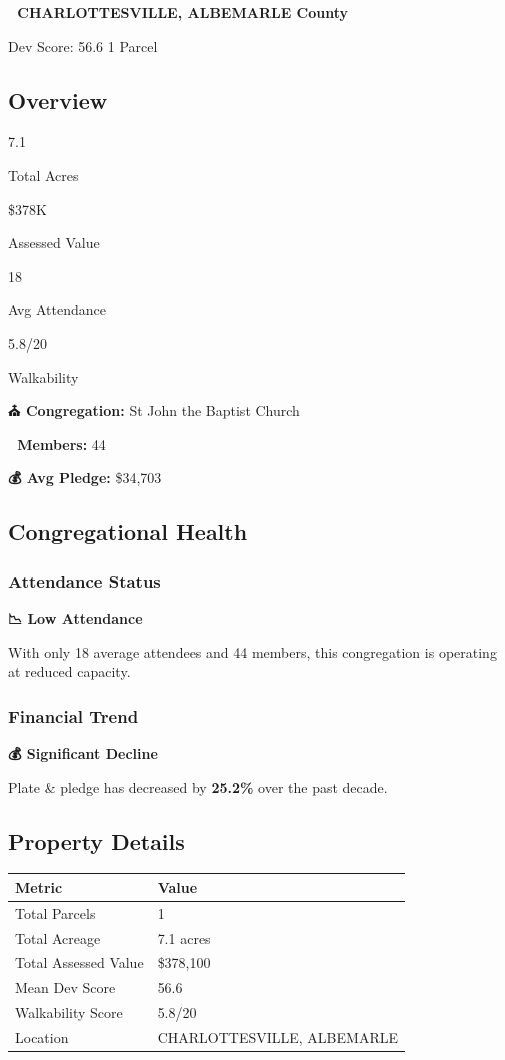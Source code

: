 \documentclass[
  letterpaper,
  DIV=11,
  numbers=noendperiod,
  oneside]{scrreprt}
\begin{document}

\textbf{📍 CHARLOTTESVILLE, ALBEMARLE County}

{Dev Score: 56.6} {1 Parcel}

\subsection{Overview}

{7.1}

{Total Acres}

{\$378K}

{Assessed Value}

{18}

{Avg Attendance}

{5.8/20}

{Walkability}

\textbf{⛪ Congregation:} St John the Baptist Church

\textbf{👥 Members:} 44

\textbf{💰 Avg Pledge:} \$34,703

\subsection{Congregational Health}

\subsubsection{Attendance Status}\label{attendance-status-6}

\textbf{📉 Low Attendance}

With only 18 average attendees and 44 members, this congregation is
operating at reduced capacity.

\subsubsection{Financial Trend}\label{financial-trend-6}

\textbf{💰 Significant Decline}

Plate \& pledge has decreased by \textbf{25.2\%} over the past decade.

\subsection{Property Details}

\begin{longtable}[]{@{}ll@{}}
\toprule\noalign{}
Metric & Value \\
\midrule\noalign{}
\endhead
\bottomrule\noalign{}
\endlastfoot
Total Parcels & 1 \\
Total Acreage & 7.1 acres \\
Total Assessed Value & \$378,100 \\
Mean Dev Score & 56.6 \\
Walkability Score & 5.8/20 \\
Location & CHARLOTTESVILLE, ALBEMARLE \\
\end{longtable}
\end{document}
